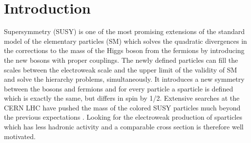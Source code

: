 \section{Introduction}
\label{sect:introduction}

Supersymmetry  (SUSY) \cite{Golfand:1971iw,Wess:1973kz,Wess:1974tw,Fayet1,Fayet2} is one of the most promising extensions of the 
standard model of the elementary particles (SM) which solves the 
quadratic divergences in the corrections to the mass of the Higgs boson from the fermions by introducing the new
bosons with proper couplings. The newly defined particles can fill the scales between the electroweak scale and 
the upper limit of the validity of SM and solve the  hierarchy problems, simultaneously. 
It introduces a new symmetry between the bosons and fermions and 
for every particle a sparticle is defined which is exactly the same, but differs in spin by 1/2. 
Extensive searches at the CERN LHC have pushed the mass of the colored SUSY particles much beyond the previous expectations \cite{Chatrchyan:2012sa,Chatrchyan:2012te,Chatrchyan:2012ira,Chatrchyan:2012qka,Chatrchyan:2011ek,Chatrchyan:2012ola,Chatrchyan:2012bba,Chatrchyan:2012mea,Chatrchyan:2013xna,Chatrchyan:2013xsw,Chatrchyan:2013wxa,Chatrchyan:2013fea}. %
Looking for the electroweak production of sparticles which has less hadronic activity and a comparable cross section is therefore well motivated.

